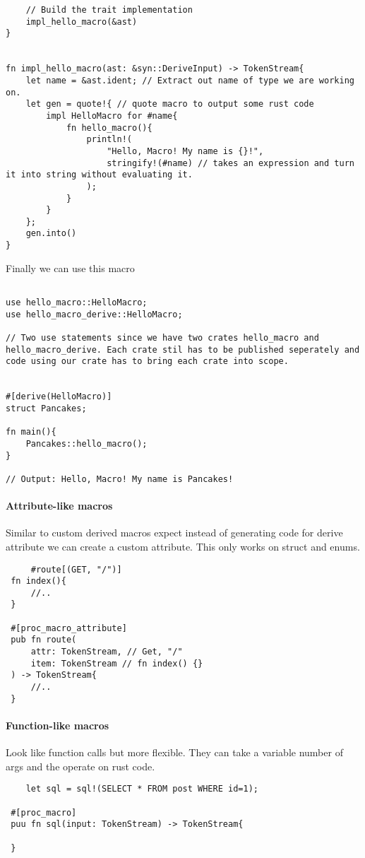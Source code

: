 \begin{example}
\begin{lstlisting}
    // Build the trait implementation
    impl_hello_macro(&ast)
}


fn impl_hello_macro(ast: &syn::DeriveInput) -> TokenStream{
    let name = &ast.ident; // Extract out name of type we are working on.
    let gen = quote!{ // quote macro to output some rust code
        impl HelloMacro for #name{
            fn hello_macro(){
                println!(
                    "Hello, Macro! My name is {}!",
                    stringify!(#name) // takes an expression and turn it into string without evaluating it.
                );
            }
        }
    };
    gen.into()
}
\end{lstlisting}

Finally we can use this macro\begin{lstlisting}
    
use hello_macro::HelloMacro;
use hello_macro_derive::HelloMacro;

// Two use statements since we have two crates hello_macro and hello_macro_derive. Each crate stil has to be published seperately and code using our crate has to bring each crate into scope.


#[derive(HelloMacro)]
struct Pancakes;

fn main(){
    Pancakes::hello_macro();
}

// Output: Hello, Macro! My name is Pancakes!
\end{lstlisting}
\end{example}

\paragraph*{Attribute-like macros}
Similar to custom derived macros expect instead of generating code for derive attribute we can create a custom attribute. This only works on struct and enums.
\begin{lstlisting}
     #route[(GET, "/")]
 fn index(){
     //..
 }

 #[proc_macro_attribute]
 pub fn route(
     attr: TokenStream, // Get, "/"
     item: TokenStream // fn index() {}
 ) -> TokenStream{
     //..
 }
\end{lstlisting}

\paragraph*{Function-like macros}
Look like function calls but more flexible. They can take a variable number of args and the operate on rust code.\begin{lstlisting}
    let sql = sql!(SELECT * FROM post WHERE id=1);

 #[proc_macro]
 puu fn sql(input: TokenStream) -> TokenStream{

 }
\end{lstlisting}

